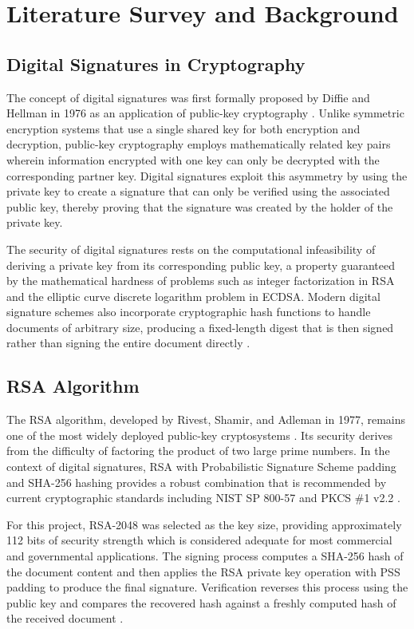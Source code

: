 \chapter{Literature Survey and Background}

\section{Digital Signatures in Cryptography}

The concept of digital signatures was first formally proposed by Diffie and Hellman in 1976 as an application of public-key cryptography \cite{diffie1976}. Unlike symmetric encryption systems that use a single shared key for both encryption and decryption, public-key cryptography employs mathematically related key pairs wherein information encrypted with one key can only be decrypted with the corresponding partner key. Digital signatures exploit this asymmetry by using the private key to create a signature that can only be verified using the associated public key, thereby proving that the signature was created by the holder of the private key.

The security of digital signatures rests on the computational infeasibility of deriving a private key from its corresponding public key, a property guaranteed by the mathematical hardness of problems such as integer factorization in RSA and the elliptic curve discrete logarithm problem in ECDSA. Modern digital signature schemes also incorporate cryptographic hash functions to handle documents of arbitrary size, producing a fixed-length digest that is then signed rather than signing the entire document directly \cite{stallings2017}.

\section{RSA Algorithm}

The RSA algorithm, developed by Rivest, Shamir, and Adleman in 1977, remains one of the most widely deployed public-key cryptosystems \cite{rivest1978}. Its security derives from the difficulty of factoring the product of two large prime numbers. In the context of digital signatures, RSA with Probabilistic Signature Scheme padding and SHA-256 hashing provides a robust combination that is recommended by current cryptographic standards including NIST SP 800-57 and PKCS \#1 v2.2 \cite{nist2020dss,pkcs1}.

For this project, RSA-2048 was selected as the key size, providing approximately 112 bits of security strength which is considered adequate for most commercial and governmental applications. The signing process computes a SHA-256 hash of the document content and then applies the RSA private key operation with PSS padding to produce the final signature. Verification reverses this process using the public key and compares the recovered hash against a freshly computed hash of the received document \cite{nist2020shs}.

